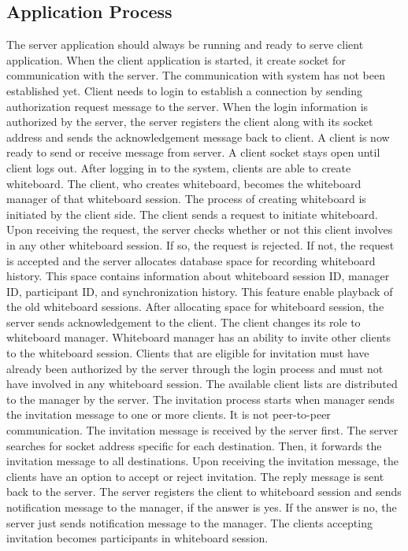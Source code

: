 \documentclass[conference]{IEEEtran}
\begin{document}
\subsection{Application Process}
The server application should always be running and ready to serve client application. When the client application is started, it create socket for communication with the server. The communication with system has not been established yet.  Client needs to login to establish a connection by sending authorization request message to the server. When the login information is authorized by the server, the server registers the client along with its socket address and sends the acknowledgement message back to client. A client is now ready to send or receive message from server. A client socket stays open until client logs out.
After logging in to the system, clients are able to create whiteboard. The client, who creates whiteboard, becomes the whiteboard manager of that whiteboard session. The process of creating whiteboard is initiated by the client side. The client sends a request to initiate whiteboard. Upon receiving the request, the server checks whether or not this client involves in any other whiteboard session. If so, the request is rejected. If not, the request is accepted and the server allocates database space for recording whiteboard history. This space contains information about whiteboard session ID, manager ID, participant ID, and synchronization history. This feature enable playback of the old whiteboard sessions. After allocating space for whiteboard session, the server sends acknowledgement to the client. The client changes its role to whiteboard manager.
Whiteboard manager has an ability to invite other clients to the whiteboard session. Clients that are eligible for invitation must have already been authorized by the server through the login process and must not have involved in any whiteboard session. The available client lists are distributed to the manager by the server. The invitation process starts when manager sends the invitation message to one or more clients. It is not peer-to-peer communication. The invitation message is received by the server first. The server searches for socket address specific for each destination. Then, it forwards the invitation message to all destinations. Upon receiving the invitation message, the clients have an option to accept or reject invitation. The reply message is sent back to the server. The server registers the client to whiteboard session and sends notification message to the manager, if the answer is yes. If the answer is no, the server just sends notification message to the manager. The clients accepting invitation becomes participants in whiteboard session.
\end{document}
